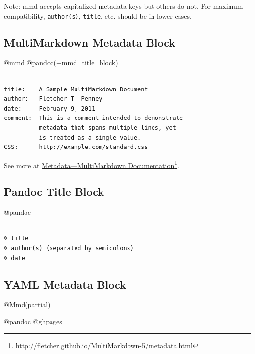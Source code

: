 Note: mmd accepts capitalized metadata keys but others do not. For maximum compatibility, \texttt{author(s)}, \texttt{title}, etc. should be in lower cases.

\subsection{MultiMarkdown Metadata Block}
\label{multimarkdownmetadatablock}

@mmd @pandoc(+mmd\_title\_block)

\begin{adjustwidth}{2.5em}{2.5em}
\begin{verbatim}

title:    A Sample MultiMarkdown Document  
author:   Fletcher T. Penney  
date:     February 9, 2011  
comment:  This is a comment intended to demonstrate  
          metadata that spans multiple lines, yet  
          is treated as a single value.  
CSS:      http://example.com/standard.css

\end{verbatim}
\end{adjustwidth}

See more at \href{http://fletcher.github.io/MultiMarkdown-5/metadata.html}{Metadata---MultiMarkdown Documentation}\footnote{\href{http://fletcher.github.io/MultiMarkdown-5/metadata.html}{http:/\slash fletcher.github.io\slash MultiMarkdown-5\slash metadata.html}}.

\subsection{Pandoc Title Block}
\label{pandoctitleblock}

@pandoc

\begin{adjustwidth}{2.5em}{2.5em}
\begin{verbatim}

% title
% author(s) (separated by semicolons)
% date

\end{verbatim}
\end{adjustwidth}

\subsection{YAML Metadata Block}
\label{yamlmetadatablock}

@Mmd(partial)

@pandoc @ghpages

